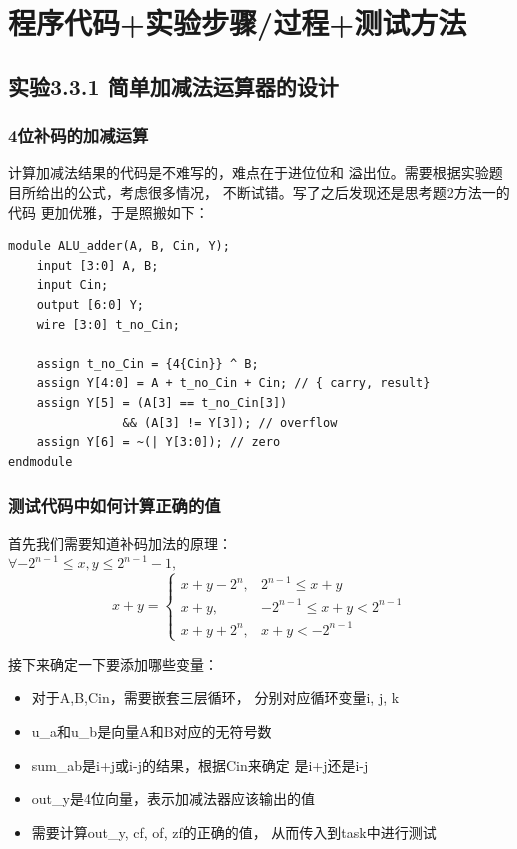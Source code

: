 \documentclass[12pt,a4paper,UTF8]{article}
\begin{document}
\section{程序代码+实验步骤/过程+测试方法}

\subsection{实验3.3.1 简单加减法运算器的设计}
\subsubsection{4位补码的加减运算}
计算加减法结果的代码是不难写的，难点在于进位位和
溢出位。需要根据实验题目所给出的公式，考虑很多情况，
不断试错。写了之后发现还是思考题2方法一的代码
更加优雅，于是照搬如下：
\begin{lstlisting}[style=verilog-style]
module ALU_adder(A, B, Cin, Y);
	input [3:0] A, B;
	input Cin;
	output [6:0] Y;
	wire [3:0] t_no_Cin;

	assign t_no_Cin = {4{Cin}} ^ B;
	assign Y[4:0] = A + t_no_Cin + Cin; // { carry, result}
	assign Y[5] = (A[3] == t_no_Cin[3]) 
	            && (A[3] != Y[3]); // overflow
	assign Y[6] = ~(| Y[3:0]); // zero 
endmodule  
\end{lstlisting}

\subsubsection{测试代码中如何计算正确的值}
首先我们需要知道补码加法的原理：\\
\indent $\forall -2^{n-1}\leqslant x, y\leqslant 2^{n-1}-1, $
\begin{equation}
  x+y=\begin{cases}
    x+y-2^n, & 2^{n-1}\leqslant x+y            \\
    x+y,     & -2^{n-1}\leqslant x+y < 2^{n-1} \\
    x+y+2^n, & x+y < -2^{n-1}
  \end{cases}
\end{equation}

接下来确定一下要添加哪些变量：
\begin{itemize}
  \item 对于A,B,Cin，需要嵌套三层循环，
        分别对应循环变量i, j, k
  \item u\_a和u\_b是向量A和B对应的无符号数
  \item sum\_ab是i+j或i-j的结果，根据Cin来确定
        是i+j还是i-j
  \item out\_y是4位向量，表示加减法器应该输出的值
  \item 需要计算out\_y, cf, of, zf的正确的值，
        从而传入到task中进行测试
\end{itemize}
\end{document}
